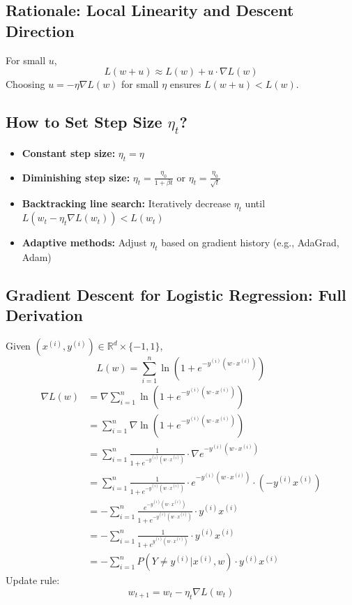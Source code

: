 \documentclass{article}
\begin{document}
\subsection{Rationale: Local Linearity and Descent Direction}
For small $u$,
\[
L(w + u) \approx L(w) + u \cdot \nabla L(w)
\]
Choosing $u = -\eta \nabla L(w)$ for small $\eta$ ensures $L(w + u) < L(w)$.

\subsection{How to Set Step Size $\eta_t$?}
\begin{itemize}
    \item \textbf{Constant step size:} $\eta_t = \eta$
    \item \textbf{Diminishing step size:} $\eta_t = \frac{\eta_0}{1 + \beta t}$ or $\eta_t = \frac{\eta_0}{\sqrt{t}}$
    \item \textbf{Backtracking line search:} Iteratively decrease $\eta_t$ until $L(w_t - \eta_t \nabla L(w_t)) < L(w_t)$
    \item \textbf{Adaptive methods:} Adjust $\eta_t$ based on gradient history (e.g., AdaGrad, Adam)
\end{itemize}

\subsection{Gradient Descent for Logistic Regression: Full Derivation}
Given $(x^{(i)}, y^{(i)}) \in \mathbb{R}^d \times \{-1,1\}$,
\[
L(w) = \sum_{i=1}^n \ln(1 + e^{-y^{(i)}(w \cdot x^{(i)})})
\]
\begin{align}
\nabla L(w) &= \nabla \sum_{i=1}^{n} \ln(1 + e^{-y^{(i)}(w \cdot x^{(i)})}) \\
&= \sum_{i=1}^{n} \nabla \ln(1 + e^{-y^{(i)}(w \cdot x^{(i)})}) \\
&= \sum_{i=1}^{n} \frac{1}{1 + e^{-y^{(i)}(w \cdot x^{(i)})}} \cdot \nabla e^{-y^{(i)}(w \cdot x^{(i)})} \\
&= \sum_{i=1}^{n} \frac{1}{1 + e^{-y^{(i)}(w \cdot x^{(i)})}} \cdot e^{-y^{(i)}(w \cdot x^{(i)})} \cdot (-y^{(i)}x^{(i)}) \\
&= -\sum_{i=1}^{n} \frac{e^{-y^{(i)}(w \cdot x^{(i)})}}{1 + e^{-y^{(i)}(w \cdot x^{(i)})}} \cdot y^{(i)}x^{(i)} \\
&= -\sum_{i=1}^{n} \frac{1}{1 + e^{y^{(i)}(w \cdot x^{(i)})}} \cdot y^{(i)}x^{(i)} \\
&= -\sum_{i=1}^{n} P(Y \neq y^{(i)} | x^{(i)}, w) \cdot y^{(i)}x^{(i)}
\end{align}
Update rule:
\[
w_{t+1} = w_t - \eta_t \nabla L(w_t)
\]
\end{document}
